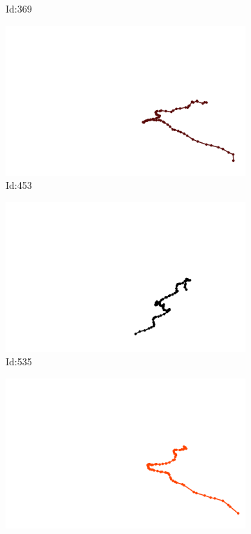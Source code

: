 \documentclass[12pt,twoside]{report}
\begin{document}
\begin{figure}
\begin{subfigure}[b]{0.20\textwidth}
\caption{Id:369}
\end{subfigure}
\begin{subfigure}[b]{0.20\textwidth}
\centering
\includegraphics[width=\textwidth]{../../trajectories/453.png}
\caption{Id:453}
\end{subfigure}
\begin{subfigure}[b]{0.20\textwidth}
\centering
\includegraphics[width=\textwidth]{../../trajectories/535.png}
\caption{Id:535}
\end{subfigure}
\begin{subfigure}[b]{0.20\textwidth}
\centering
\includegraphics[width=\textwidth]{../../trajectories/611.png}

\end{subfigure}
\end{figure}
\end{document}
